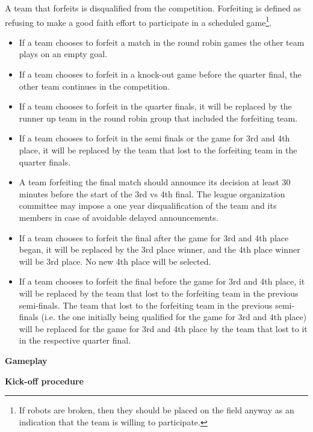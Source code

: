 A team that forfeits is disqualified from the competition. Forfeiting is defined as refusing to make a good faith effort to participate in a scheduled game\footnote{If robots are broken, then they should be placed on the field anyway as an indication that the team is willing to participate.}.
\begin{itemize}
\item If a team chooses to forfeit a match in the round robin games the other team plays on an empty goal.
\item If a team chooses to forfeit in a knock-out game before the quarter final, the other team continues in the competition.
\item If a team chooses to forfeit in the quarter finals, it will be replaced by the runner up team in the round robin group that included the forfeiting team.
\item If a team chooses to forfeit in the semi finals or the game for 3rd and 4th place, it will be replaced by the team that lost to the forfeiting team in the quarter finals.
\item A team forfeiting the final match should announce its decision at least 30 minutes before the start of the 3rd vs 4th final.  The league organization committee may impose a one year disqualification of the team and its members in case of avoidable delayed announcements.
\item If a team chooses to forfeit the final after the game for 3rd and 4th place began, it will be replaced by the 3rd place winner, and the 4th place winner will be 3rd place. No new 4th place will be selected.
\item If a team chooses to forfeit the final before the game for 3rd and 4th place, it will be replaced by the team that lost to the forfeiting team in the previous semi-finals. The team that lost to the forfeiting team in the previous semi-finals (i.e. the one initially being qualified for the game for 3rd and 4th place) will be replaced for the game for 3rd and 4th place by the team that lost to it in the respective quarter final.
\end{itemize}

\clearpage
{\bfseries Gameplay}

\headlinebox
 
{\bfseries Kick-off procedure}


